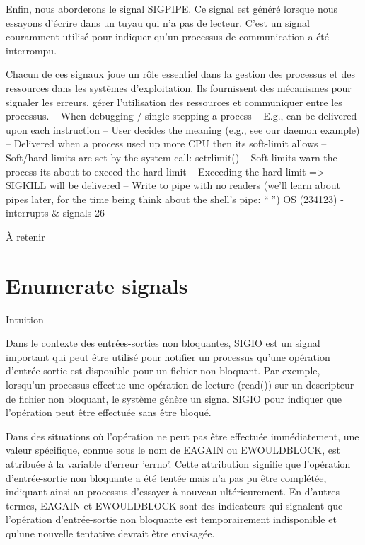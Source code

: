 \documentclass[12pt]{article}
\begin{document}
Enfin, nous aborderons le signal SIGPIPE. Ce signal est généré lorsque nous essayons d'écrire dans un tuyau qui n'a pas de lecteur. C'est un signal couramment utilisé pour indiquer qu'un processus de communication a été interrompu.

Chacun de ces signaux joue un rôle essentiel dans la gestion des processus et des ressources dans les systèmes d'exploitation. Ils fournissent des mécanismes pour signaler les erreurs, gérer l'utilisation des ressources et communiquer entre les processus.
– When debugging / single-stepping a process
– E.g., can be delivered upon each instruction
– User decides the meaning (e.g., see our daemon example)
– Delivered when a process used up more CPU then its soft-limit allows
– Soft/hard limits are set by the system call: setrlimit()
– Soft-limits warn the process its about to exceed the hard-limit
– Exceeding the hard-limit => SIGKILL will be delivered
– Write to pipe with no readers (we’ll learn about pipes later, for the
time being think about the shell’s pipe: “|”)
OS (234123) - interrupts \& signals
26
\begin{aretenir}{À retenir}
\end{aretenir}

\section{Enumerate signals}
\begin{myvulga}{Intuition}
\end{myvulga}
Dans le contexte des entrées-sorties non bloquantes, SIGIO est un signal important qui peut être utilisé pour notifier un processus qu'une opération d'entrée-sortie est disponible pour un fichier non bloquant. Par exemple, lorsqu'un processus effectue une opération de lecture (read()) sur un descripteur de fichier non bloquant, le système génère un signal SIGIO pour indiquer que l'opération peut être effectuée sans être bloqué.

Dans des situations où l'opération ne peut pas être effectuée immédiatement, une valeur spécifique, connue sous le nom de EAGAIN ou EWOULDBLOCK, est attribuée à la variable d'erreur 'errno'. Cette attribution signifie que l'opération d'entrée-sortie non bloquante a été tentée mais n'a pas pu être complétée, indiquant ainsi au processus d'essayer à nouveau ultérieurement. En d'autres termes, EAGAIN et EWOULDBLOCK sont des indicateurs qui signalent que l'opération d'entrée-sortie non bloquante est temporairement indisponible et qu'une nouvelle tentative devrait être envisagée.
\end{document}
